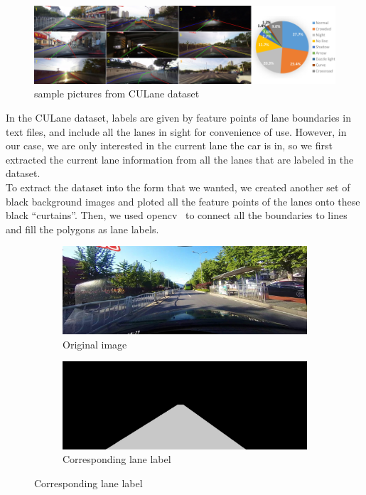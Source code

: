\documentclass[runningheads]{llncs}
\begin{document}
\begin{figure}
\centering
\includegraphics[width=\textwidth]{Figure1}
\caption{sample pictures from CULane dataset~\cite{ref:7}} \label{fig:1}
\end{figure}
	
In the CULane dataset, labels are given by feature points of lane boundaries in text files, and include all the lanes in sight for convenience of use. However, in our case, we are only interested in the current lane the car is in, so we first extracted the current lane information from all the lanes that are labeled in the dataset. \\

To extract the dataset into the form that we wanted, we created another set of black background images and ploted all the feature points of the lanes onto these black “curtains”. Then, we used opencv~\cite{ref:9} to connect all the boundaries to lines and fill the polygons as lane labels.

\begin{figure}[H]
\begin{subfigure}{.5\textwidth}
  \centering
  \includegraphics[width=.8\linewidth]{Figure2a}
  \caption{Original image}
  \label{fig:2sfig1}
\end{subfigure}%
\begin{subfigure}{.5\textwidth}
  \centering
  \includegraphics[width=.8\linewidth]{Figure2b}
  \caption{Corresponding lane label}
  \label{fig:2sfig2}
\end{subfigure}
\label{fig:2}
\end{figure}
	
\end{document}
